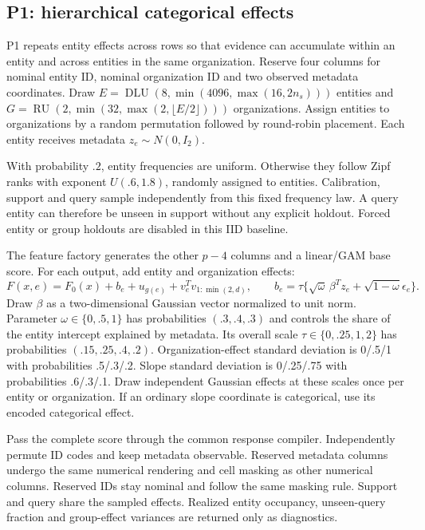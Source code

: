 \documentclass[11pt]{article}
\begin{document}
\subsection{P1: hierarchical categorical effects}\label{sec:p1-full}

P1 repeats entity effects across rows so that evidence can accumulate within an entity and across entities in the same organization. Reserve four columns for nominal entity ID, nominal organization ID and two observed metadata coordinates. Draw $E=\operatorname{DLU}(8,\min(4096,\max(16,2n_s)))$ entities and $G=\operatorname{RU}(2,\min(32,\max(2,\lfloor E/2\rfloor)))$ organizations. Assign entities to organizations by a random permutation followed by round-robin placement. Each entity receives metadata $z_e\sim N(0,I_2)$.

With probability $.2$, entity frequencies are uniform. Otherwise they follow Zipf ranks with exponent $U(.6,1.8)$, randomly assigned to entities. Calibration, support and query sample independently from this fixed frequency law. A query entity can therefore be unseen in support without any explicit holdout. Forced entity or group holdouts are disabled in this IID baseline.

The feature factory generates the other $p-4$ columns and a linear/GAM base score. For each output, add entity and organization effects:
\[
F(x,e)=F_0(x)+b_e+u_{g(e)}+v_e^T v_{1:\min(2,d)},\qquad
b_e=\tau\{\sqrt\omega\,\beta^Tz_e+\sqrt{1-\omega}\epsilon_e\}.
\]
Draw $\beta$ as a two-dimensional Gaussian vector normalized to unit norm. Parameter $\omega\in\{0,.5,1\}$ has probabilities $(.3,.4,.3)$ and controls the share of the entity intercept explained by metadata. Its overall scale $\tau\in\{0,.25,1,2\}$ has probabilities $(.15,.25,.4,.2)$. Organization-effect standard deviation is 0/.5/1 with probabilities .5/.3/.2. Slope standard deviation is 0/.25/.75 with probabilities .6/.3/.1. Draw independent Gaussian effects at these scales once per entity or organization. If an ordinary slope coordinate is categorical, use its encoded categorical effect.

Pass the complete score through the common response compiler. Independently permute ID codes and keep metadata observable. Reserved metadata columns undergo the same numerical rendering and cell masking as other numerical columns. Reserved IDs stay nominal and follow the same masking rule. Support and query share the sampled effects. Realized entity occupancy, unseen-query fraction and group-effect variances are returned only as diagnostics.
\end{document}
